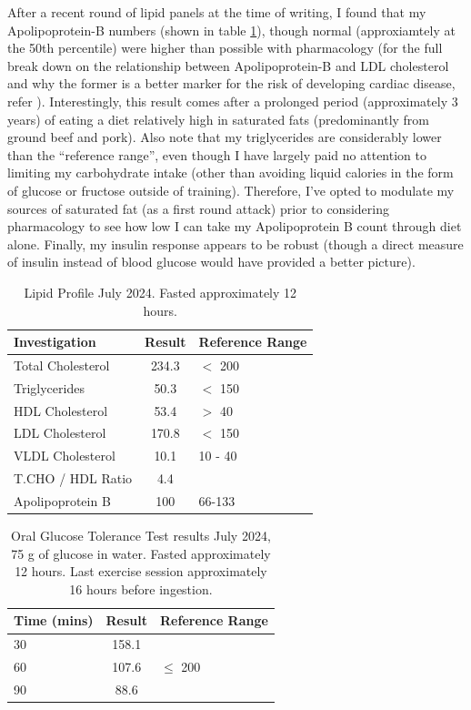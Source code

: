 \documentclass[10pt,twocolumn]{extarticle}
\begin{document}
After a recent round of lipid panels at the time of writing, I found that my Apolipoprotein-B numbers (shown in table \ref{tab:lipid_profile}), though normal (approxiamtely at the 50th percentile) were higher than possible with pharmacology (for the full break down on the relationship between Apolipoprotein-B and LDL cholesterol and why the former is a better marker for the risk of developing cardiac disease, refer \cite{attia2012,sniderman2002and}). Interestingly, this result comes after a prolonged period (approximately 3 years) of eating a diet relatively high in saturated fats (predominantly from ground beef and pork). Also note that my triglycerides are considerably lower than the ``reference range'', even though I have largely paid no attention to limiting my carbohydrate intake (other than avoiding liquid calories in the form of glucose or fructose outside of training). Therefore, I've opted to modulate my sources of saturated fat \cite{furtado2008effect} (as a first round attack) prior to considering pharmacology \cite{Attia_2024} to see how low I can take my Apolipoprotein B count through diet alone. Finally, my insulin response appears to be robust (though a direct measure of insulin instead of blood glucose would have provided a better picture).

\begin{table}[h!]
    \centering
    \begin{tabular}{lcp{1.5cm}}
        \toprule
        \textbf{Investigation} & \textbf{Result} & \textbf{Reference Range} \\
        \midrule
        Total Cholesterol & 234.3 & $<$ 200 \\
        Triglycerides & 50.3 & $<$ 150 \\
        HDL Cholesterol & 53.4 & $>$ 40 \\
        LDL Cholesterol & 170.8 & $<$ 150 \\
        VLDL Cholesterol & 10.1 & 10 - 40 \\
        T.CHO / HDL Ratio & 4.4 & \\
        Apolipoprotein B & 100 & 66-133\\
        \bottomrule
    \end{tabular}
    \caption{Lipid Profile July 2024. Fasted approximately 12 hours.}
    \label{tab:lipid_profile}
\end{table}

\begin{table}[h!]
    \centering
    \begin{tabular}{p{1.5cm}cp{1.5cm}}
        \toprule
        \textbf{Time (mins)} & \textbf{Result} & \textbf{Reference Range} \\
        \midrule
        30 & 158.1 & \\
        60 & 107.6  & $\le$ 200 \\
        90 & 88.6  & \\
        \bottomrule
    \end{tabular}
    \caption{Oral Glucose Tolerance Test results July 2024, 75 g of glucose in water. Fasted approximately 12 hours. Last exercise session approximately 16 hours before ingestion.}
    \label{tab:glucose_test}
\end{table}
\end{document}
